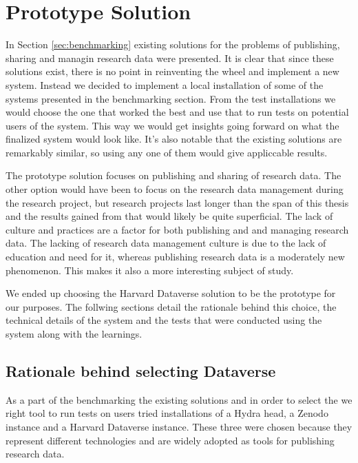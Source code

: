 \chapter{Prototype Solution}
\label{chapter:prototype}

In Section \ref{sec:benchmarking} existing solutions for the problems of
publishing, sharing and managin research data were presented. It is clear that
since these solutions exist, there is no point in reinventing the wheel and
implement a new system. Instead we decided to implement a local installation
of some of the systems presented in the benchmarking section. From the test
installations we would choose the one that worked the best and use that to
run tests on potential users of the system. This way we would get insights
going forward on what the finalized system would look like. It's also notable
that the existing solutions are remarkably similar, so using any one of them
would give appliccable results.

The prototype solution focuses on publishing and sharing of research data. The
other option would have been to focus on the research data management during
the research project, but research projects last longer than the span of this
thesis and the results gained from that would likely be quite superficial.
The lack of culture and practices are a factor for both publishing and
and managing research data. The lacking of research data management culture is
due to the lack of education and need for it, whereas publishing research data
is a moderately new phenomenon. This makes it also a more interesting subject
of study.

We ended up choosing the Harvard Dataverse solution to be the prototype for our
purposes. The follwing sections detail the rationale behind this choice, the
technical details of the system and the tests that were conducted using the
system along with the learnings.

\section{Rationale behind selecting Dataverse}

As a part of the benchmarking the existing solutions and in order to select the
we right tool to run tests on users tried installations of a Hydra head, a
Zenodo instance and a Harvard Dataverse instance. These three were chosen
because they represent different technologies and are widely adopted as tools
for publishing research data.


